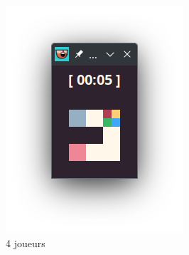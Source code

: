 \begin{figure}[!htb]
\begin{subfigure}[b]{0.2\textwidth}
        \includegraphics[width=\textwidth]{ressources/Implementation/Labyrinthe/Vue/Players/4Players.png}
        \caption{4 joueurs}
    \end{subfigure}
    \hfill
    \begin{subfigure}[b]{0.2\textwidth}

\end{subfigure}
\end{figure}
